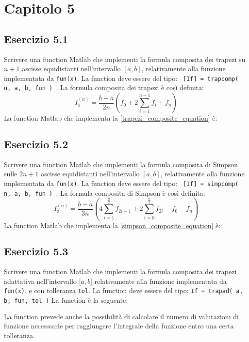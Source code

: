 \section{Capitolo 5}



	\subsection{Esercizio 5.1}
	
Scrivere una function Matlab che implementi la formula composita dei trapezi su $n+1$ ascisse equidistanti nell'intervallo $[a, b]$, relativamente alla funzione implementata da \texttt{fun(x)}. 
La function deve essere del tipo: \texttt{ [If] = trapcomp( n, a, b, fun ) }.
\PP
La formula composita dei trapezi è così definita:
\begin{equation}\label{trapezi_composite_equation}
	I_1^{(n)} = \frac{b-a}{2n} (f_0 + 2\sum_{i=1}^{n-1}f_i + f_n)
\end{equation}
La function Matlab che implementa la \ref{trapezi_composite_equation} è:




	\subsection{Esercizio 5.2}
	
Scrivere una function Matlab che implementi la formula composita di Simpson sulle $2n+1$ ascisse equidistanti nell'intervallo $[a, b]$, relativamente alla funzione implementata da \texttt{fun(x)}. 
La function deve essere del tipo: \texttt{ [If] = simpcomp( n, a, b, fun ) }.
\PP
La formula composita di Simpson è così definita:
\begin{equation}\label{simpson_composite_equation}
	I_2^{(n)} = \frac{b-a}{3n} (4\sum_{i=1}^{\frac{n}{2}}f_{2i-1} +2\sum_{i=0}^{\frac{n}{2}}f_{2i} - f_0 - f_n)
\end{equation}
La function Matlab che implementa la \ref{simpson_composite_equation} è:




	\subsection{Esercizio 5.3}
	
	Scrivere una function Matlab che implementi la formula composita dei trapezi adattativa nell’intervallo $\lbrack a,b \rbrack$  relativamente alla funzione implementata da \lstinline{fun(x)}, e con tolleranza \lstinline{tol}. La function deve essere del tipo: \lstinline{If = trapad( a, b, fun, tol )}
\PP
La function è la seguente:

La function prevede anche la possibilità di calcolare il numero di valutazioni di funzione necesssarie per raggiungere l'integrale della funzione entro una certa tolleranza.



